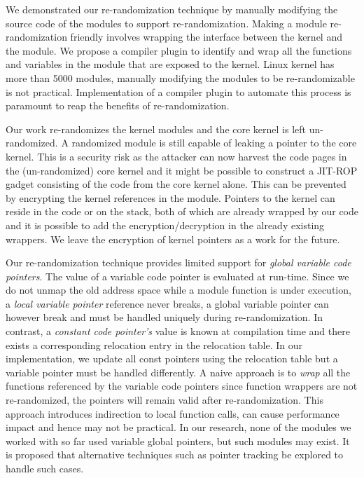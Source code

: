 We demonstrated our re-randomization technique by manually modifying the source code of the modules to support re-randomization. Making a module re-randomization friendly involves wrapping the interface between the kernel and the module. We propose a compiler plugin to identify and wrap all the functions and variables in the module that are exposed to the kernel. Linux kernel has more than 5000 modules, manually modifying the modules to be re-randomizable is not practical. Implementation of a compiler plugin to automate this process is paramount to reap the benefits of re-randomization.

Our work re-randomizes the kernel modules and the core kernel is left un-randomized. A randomized module is still capable of leaking a pointer to the core kernel. This is a security risk as the attacker can now harvest the code pages in the (un-randomized) core kernel and it might be possible to construct a JIT-ROP gadget consisting of the code from the core kernel alone. This can be prevented by encrypting the kernel references in the module. Pointers to the kernel can reside in the code or on the stack, both of which are already wrapped by our code and it is possible to add the encryption/decryption in the already existing wrappers. We leave the encryption of kernel pointers as a work for the future.

Our re-randomization technique provides limited support for \textit{global variable code pointers}. The value of a variable code pointer is evaluated at run-time. Since we do not unmap the old address space while a module function is under execution, a \textit{local variable pointer} reference never breaks, a global variable pointer can however break and must be handled uniquely during re-randomization. In contrast, a \textit{constant code pointer's} value is known at compilation time and there exists a corresponding relocation entry in the relocation table. In our implementation, we update all const pointers using the relocation table but a variable pointer must be handled differently. A naive approach is to \textit{wrap} all the functions referenced by the variable code pointers since function wrappers are not re-randomized, the pointers will remain valid after re-randomization. This approach introduces indirection to local function calls, can cause performance impact and hence may not be practical. In our research, none of the modules we worked with so far used variable global pointers, but such modules may exist. It is proposed that alternative techniques such as pointer tracking be explored to handle such cases.